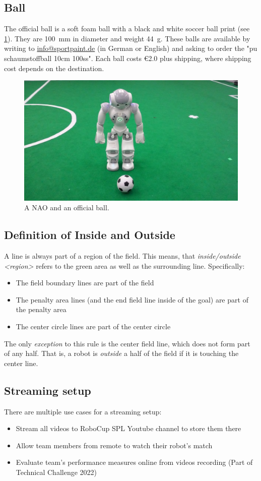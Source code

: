 \subsection{Ball}
\label{sec:ball}

The official ball is a soft foam ball with a black and white soccer ball print (see \cref{fig:ball}). They are \qty{100}{\milli\metre} in diameter and weight \qty{44}{\gram}. These balls are available by writing to \url{info@sportpaint.de} (in German or English) and asking to order the "pu schaumstoffball 10cm 100ss".  Each ball costs \euro{2.0} plus shipping, where shipping cost depends on the destination.

\begin{figure}[t]
  \centerline{\includegraphics[height=0.28\columnwidth]{figs/robotWithBall2016.jpg}}
  \caption{A NAO and an official ball.}
  \label{fig:ball}
\end{figure}

\subsection{Definition of Inside and Outside}
\label{sec:inside_outside}

A line is always part of a region of the field.
This means, that \emph{inside/outside \textless region\textgreater} refers to the green area as well as the surrounding line.
Specifically:
\begin{itemize}
    \item The field boundary lines are part of the field
    \item The penalty area lines (and the end field line inside of the goal) are part of the penalty area
    \item The center circle lines are part of the center circle
\end{itemize}

The only \textit{exception} to this rule is the center field line, which does not form part of any half.
That is, a robot is \textit{outside} a half of the field if it is touching the center line.

\subsection{Streaming setup}
\label{sec:streaming_setup}

There are multiple use cases for a streaming setup: 
\begin{itemize}
	\item Stream all videos to RoboCup SPL Youtube channel to store them there
	\item Allow team members from remote to watch their robot's match
	\item Evaluate team's performance measures online from videos recording (Part of Technical Challenge 2022)
\end{itemize}
